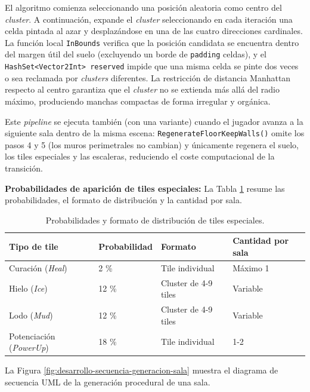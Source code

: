 El algoritmo comienza seleccionando una posición aleatoria como centro del \textit{cluster}. A continuación, expande el \textit{cluster} seleccionando en cada iteración una celda pintada al azar y desplazándose en una de las cuatro direcciones cardinales. La función local \texttt{InBounds} verifica que la posición candidata se encuentra dentro del margen útil del suelo (excluyendo un borde de \texttt{padding} celdas), y el \texttt{HashSet<Vector2Int> reserved} impide que una misma celda se pinte dos veces o sea reclamada por \textit{clusters} diferentes. La restricción de distancia Manhattan respecto al centro garantiza que el \textit{cluster} no se extienda más allá del radio máximo, produciendo manchas compactas de forma irregular y orgánica.


Este \textit{pipeline} se ejecuta también (con una variante) cuando el jugador avanza a la siguiente sala dentro de la misma escena: \texttt{RegenerateFloorKeepWalls()} omite los pasos 4 y 5 (los muros perimetrales no cambian) y únicamente regenera el suelo, los tiles especiales y las escaleras, reduciendo el coste computacional de la transición.

\textbf{Probabilidades de aparición de tiles especiales:} La Tabla \ref{tab:probabilidades-tiles} resume las probabilidades, el formato de distribución y la cantidad por sala.
\vspace{-0.5em}
\begin{table}[H]
\centering
{\small
\begin{tabular}{|p{}|p{}|p{}|p{}|}
\hline
\textbf{Tipo de tile} & \textbf{Probabilidad} & \textbf{Formato} & \textbf{Cantidad por sala} \\ \hline
Curación (\textit{Heal}) & 2 \% & Tile individual & Máximo 1 \\ \hline
Hielo (\textit{Ice}) & 12 \% & Cluster de 4-9 tiles & Variable \\ \hline
Lodo (\textit{Mud}) & 12 \% & Cluster de 4-9 tiles & Variable \\ \hline
Potenciación (\textit{PowerUp}) & 18 \% & Tile individual & 1-2 \\ \hline
\end{tabular}
}
\caption{Probabilidades y formato de distribución de tiles especiales.}
\label{tab:probabilidades-tiles}
\end{table}
\vspace{-0.5em}

La Figura \ref{fig:desarrollo-secuencia-generacion-sala} muestra el diagrama de secuencia UML de la generación procedural de una sala.

